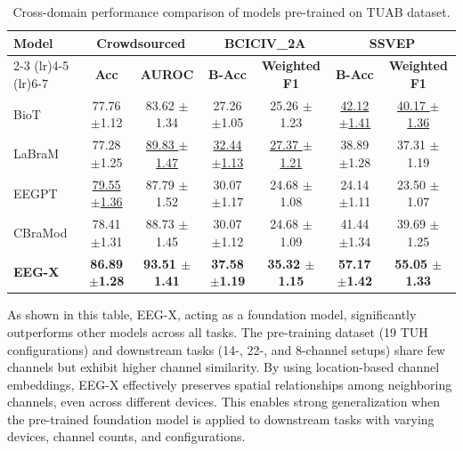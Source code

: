\documentclass{article} %
\begin{document}
\begin{table}
    \centering
    \caption{Cross-domain performance comparison of models pre-trained on TUAB dataset.}
    {\footnotesize  %
    \setlength{\tabcolsep}{5pt} %
        \begin{tabular}{l|cc|cc|cc}
            \toprule
            \multirow{2}{*}{\textbf{Model}} & \multicolumn{2}{c|}{\textbf{Crowdsourced}} & \multicolumn{2}{c|}{\textbf{BCICIV\_2A}} & \multicolumn{2}{c}{\textbf{SSVEP}} \\
            \cmidrule(lr){2-3} \cmidrule(lr){4-5} \cmidrule(lr){6-7}
            & \textbf{Acc} & \textbf{AUROC} & \textbf{B-Acc} & \textbf{Weighted F1} & \textbf{B-Acc} & \textbf{Weighted F1} \\
            \midrule
            BioT    & 77.76 $\pm$\tiny{1.12} & 83.62 $\pm$\tiny{1.34} & 27.26 $\pm$\tiny{1.05} & 25.26 $\pm$\tiny{1.23} & \underline{42.12 $\pm$\tiny{1.41}} & \underline{40.17 $\pm$\tiny{1.36}} \\
            LaBraM  & 77.28 $\pm$\tiny{1.25} & \underline{89.83 $\pm$\tiny{1.47}} & \underline{32.44 $\pm$\tiny{1.13}} &  \underline{27.37 $\pm$\tiny{1.21}} & 38.89 $\pm$\tiny{1.28} & 37.31 $\pm$\tiny{1.19} \\
            EEGPT   & \underline{79.55 $\pm$\tiny{1.36}} & 87.79 $\pm$\tiny{1.52} & 30.07 $\pm$\tiny{1.17} & 24.68 $\pm$\tiny{1.08} & 24.14 $\pm$\tiny{1.11} & 23.50 $\pm$\tiny{1.07} \\
            CBraMod & 78.41 $\pm$\tiny{1.31} & 88.73 $\pm$\tiny{1.45} & 30.07 $\pm$\tiny{1.12} & 24.68 $\pm$\tiny{1.09} & 41.44 $\pm$\tiny{1.34} & 39.69 $\pm$\tiny{1.25} \\
            \midrule
            \rowcolor{blue!10} \textbf{EEG-X} & \textbf{86.89 $\pm$\tiny{1.28}} & \textbf{93.51 $\pm$\tiny{1.41}} & \textbf{37.58 $\pm$\tiny{1.19}} & \textbf{35.32 $\pm$\tiny{1.15}} & \textbf{57.17 $\pm$\tiny{1.42}} & \textbf{55.05 $\pm$\tiny{1.33}}  \\ %
            \bottomrule
        \end{tabular}
        }
    \label{tab:cross-domain}
    \vspace{-0.5cm}
\end{table}
As shown in this table, EEG-X, acting as a foundation model, significantly outperforms other models across all tasks. The pre-training dataset (19 TUH configurations) and downstream tasks (14-, 22-, and 8-channel setups) share few channels but exhibit higher channel similarity. By using location-based channel embeddings, EEG-X effectively preserves spatial relationships among neighboring channels, even across different devices. This enables strong generalization when the pre-trained foundation model is applied to downstream tasks with varying devices, channel counts, and configurations.
\vspace{-0.3cm}
\end{document}
